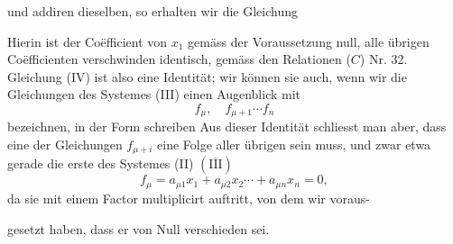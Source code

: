 und addiren dieselben, so erhalten wir die Gleichung





Hierin ist der Co\"efficient von $x_1$ gem\"ass der Voraussetzung null, alle
\"ubrigen Co\"efficienten verschwinden identisch, gem\"ass den Relationen
($C$) Nr. 32. Gleichung (IV) ist also eine Identit\"at; wir k\"onnen sie
auch, wenn wir die Gleichungen des Systemes (III) einen Augenblick mit
\[
f_\mu, \quad f_{\mu+1} \cdots f_n
\]
bezeichnen, in der Form schreiben
Aus dieser Identit\"at schliesst man aber, dass eine der Gleichungen
$f_{\mu+i}$ eine Folge aller \"ubrigen sein muss, und zwar etwa gerade die
erste des Systemes (II) $(\overline{\mathrm{III}})$
\[
f_\mu = a_{\mu 1} x_1 + a_{\mu 2} x_2 \cdots + a_{\mu n} x_n = 0,
\]
da sie mit einem Factor multiplicirt auftritt, von dem wir voraus-




gesetzt haben, dass er von Null verschieden sei.

